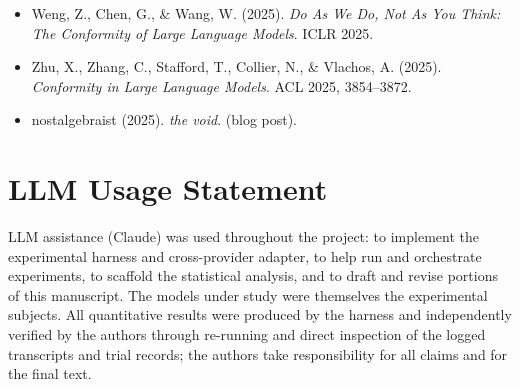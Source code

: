 \begin{itemize}
  \item Weng, Z., Chen, G., \& Wang, W. (2025). \textit{Do As We Do, Not As You
  Think: The Conformity of Large Language Models}. ICLR 2025. %

  \item Zhu, X., Zhang, C., Stafford, T., Collier, N., \& Vlachos, A. (2025).
  \textit{Conformity in Large Language Models}. ACL 2025, 3854--3872.

  \item nostalgebraist (2025). \textit{the void}. (blog post). %
\end{itemize}
\normalsize

\section*{LLM Usage Statement}
LLM assistance (Claude) was used throughout the project: to implement the
experimental harness and cross-provider adapter, to help run and orchestrate
experiments, to scaffold the statistical analysis, and to draft and revise
portions of this manuscript. The models under study were themselves the
experimental subjects. All quantitative results were produced by the harness and
independently verified by the authors through re-running and direct inspection of
the logged transcripts and trial records; the authors take responsibility for
all claims and for the final text. 
